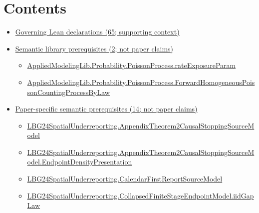 \documentclass[10pt]{article}
\begin{document}
\section*{Contents}
\begin{itemize}[leftmargin=1.2em]
\item \hyperlink{governing-declaration-section-5ef5ef0364b6939c}{Governing Lean declarations (65; supporting context)}
\item \hyperlink{library-section-378529c53c19af58}{Semantic library prerequisites (2; not paper claims)}
\begin{itemize}[leftmargin=1.2em]
\item \hyperlink{library-prerequisite-c7492b765918e40d}{Applied\allowbreak{}Modeling\allowbreak{}Lib.\allowbreak{}Probability.\allowbreak{}Poisson\allowbreak{}Process.\allowbreak{}rate\allowbreak{}Exposure\allowbreak{}Param}
\item \hyperlink{library-prerequisite-fb517e3d857fbe00}{Applied\allowbreak{}Modeling\allowbreak{}Lib.\allowbreak{}Probability.\allowbreak{}Poisson\allowbreak{}Process.\allowbreak{}Forward\allowbreak{}Homogeneous\allowbreak{}Poisson\allowbreak{}Counting\allowbreak{}Process\allowbreak{}By\allowbreak{}Law}
\end{itemize}
\item \hyperlink{paper-prerequisite-section-5ef5ef0364b6939c}{Paper-specific semantic prerequisites (14; not paper claims)}
\begin{itemize}[leftmargin=1.2em]
\item \hyperlink{paper-prerequisite-2f0b30d7fa1d57d0}{LBG24\allowbreak{}Spatial\allowbreak{}Underreporting.\allowbreak{}Appendix\allowbreak{}Theorem2\allowbreak{}Causal\allowbreak{}Stopping\allowbreak{}Source\allowbreak{}Model}
\item \hyperlink{paper-prerequisite-389857bc4c8477de}{LBG24\allowbreak{}Spatial\allowbreak{}Underreporting.\allowbreak{}Appendix\allowbreak{}Theorem2\allowbreak{}Causal\allowbreak{}Stopping\allowbreak{}Source\allowbreak{}Model.\allowbreak{}Endpoint\allowbreak{}Density\allowbreak{}Presentation}
\item \hyperlink{paper-prerequisite-8b45cca115cdd2d8}{LBG24\allowbreak{}Spatial\allowbreak{}Underreporting.\allowbreak{}Calendar\allowbreak{}First\allowbreak{}Report\allowbreak{}Source\allowbreak{}Model}
\item \hyperlink{paper-prerequisite-2154ad9c19b55cc8}{LBG24\allowbreak{}Spatial\allowbreak{}Underreporting.\allowbreak{}Collapsed\allowbreak{}Finite\allowbreak{}Stage\allowbreak{}Endpoint\allowbreak{}Model.\allowbreak{}iid\allowbreak{}Gap\allowbreak{}Law}

\end{itemize}
\end{itemize}
\end{document}
